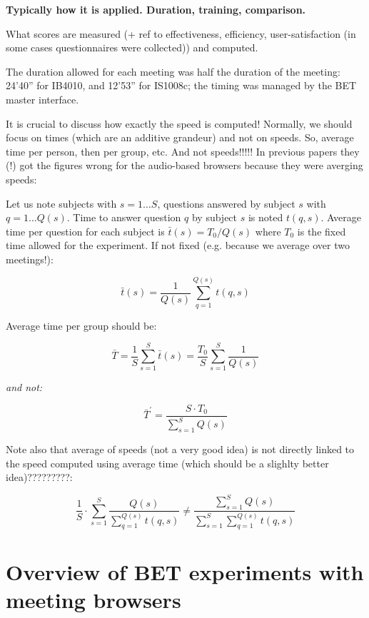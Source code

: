 \documentclass[11pt]{article}
\begin{document}
\textbf{Typically how it is applied.  Duration, training, comparison.}

What scores are measured (+ ref to effectiveness, efficiency, user-satisfaction (in some cases questionnaires were collected)) and computed.

The duration allowed for each meeting was half the duration of the meeting: 24'40'' for IB4010, and 12'53'' for IS1008c; the timing was managed by the BET master interface.

It is crucial to discuss how exactly the speed is computed!  Normally, we should focus on times (which are an additive grandeur) and not on speeds.  So, average time per person, then per group, etc.  And not speeds!!!!!  In previous papers \cite{ami-d64,popescubelis-mlmi07} they (!) got the figures wrong for the audio-based browsers because they were averging speeds:

Let us note subjects with $s=1\ldots S$, questions answered by subject $s$ with $q=1\ldots Q(s)$.  Time to answer question $q$ by subject $s$ is noted $t(q,s)$.  Average time per question for each subject is $\bar{t}(s)={T_0}/Q(s)$ where $T_0$ is the fixed time allowed for the experiment.  If not fixed (e.g. because we average over two meetings!):

  \[ \bar{t}(s)=\frac{1}{Q(s)}{\sum_{q=1}^{Q(s)}t(q,s)} \]

Average time per group should be: 

  \[ \bar{T} = \frac{1}{S}{\sum_{s=1}^{S}\bar{t}(s)} = \frac{T_0}{S}{\sum_{s=1}^{S}\frac{1}{Q(s)}} \]
  
  \textit{and not:}

  \[ \bar{T}^{\prime} = \frac{S \cdot T_0}{\sum_{s=1}^{S}Q(s)} \]
  
  Note also that average of speeds (not a very good idea) is not directly linked to the speed computed using average time (which should be a slighlty better idea)?????????:
  
  \[ \frac{1}{S} \cdot \sum_{s=1}^{S} \frac{Q(s)}{\sum_{q=1}^{Q(s)}t(q,s)} 
     \neq 
     \frac{\sum_{s=1}^{S}{Q(s)}}{\sum_{s=1}^{S}{\sum_{q=1}^{Q(s)}{t(q,s)}}} \]
  


\section{Overview of BET experiments with meeting browsers}
\label{sec:previous-results}
\end{document}
